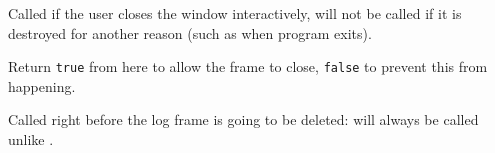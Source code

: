 Called if the user closes the window interactively, will not be
called if it is destroyed for another reason (such as when program
exits).

Return {\tt true} from here to allow the frame to close, {\tt false} to
prevent this from happening.



\label{wxlogwindowonframedelete}


Called right before the log frame is going to be deleted: will
always be called unlike .

